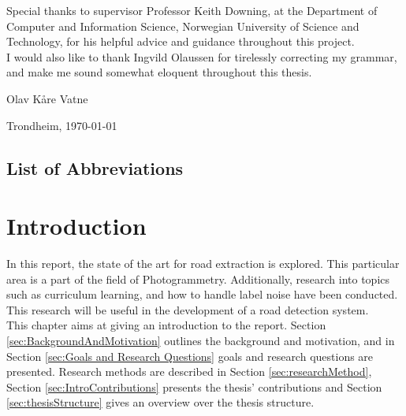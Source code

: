 \documentclass[a4paper]{book}
\newcommand{\thesisAuthor}{Olav Kåre Vatne}
\begin{document}
Special thanks to supervisor Professor Keith Downing, at the Department of Computer
and Information Science, Norwegian University of Science and Technology, for his
helpful advice and guidance throughout this project. \\

I would also like to thank Ingvild Olaussen for tirelessly correcting my grammar, and make me sound somewhat eloquent throughout this thesis.


\vfill

\hfill \thesisAuthor

\hfill Trondheim, \today

\clearpage

\section*{List of Abbreviations}
\vspace{1cm}
\begin{acronym}
\end{acronym}



\tableofcontents

\listoffigures

\listoftables


\mainmatter



\chapter{Introduction}
\label{cha:Introduction}
In this report, the state of the art for road extraction is explored. This particular area is a part of the field of Photogrammetry. Additionally, research into topics such as curriculum learning, and how to handle label noise have been conducted. This research will be useful in the development of a road detection system.\\

This chapter aims at giving an introduction to the report. Section \ref{sec:BackgroundAndMotivation} outlines the background and motivation, and in Section \ref{sec:Goals and Research Questions} goals and research questions are presented. Research methods are described in Section \ref{sec:researchMethod}, Section \ref{sec:IntroContributions} presents the thesis' contributions  and Section \ref{sec:thesisStructure} gives an overview over the thesis structure.
\end{document}
